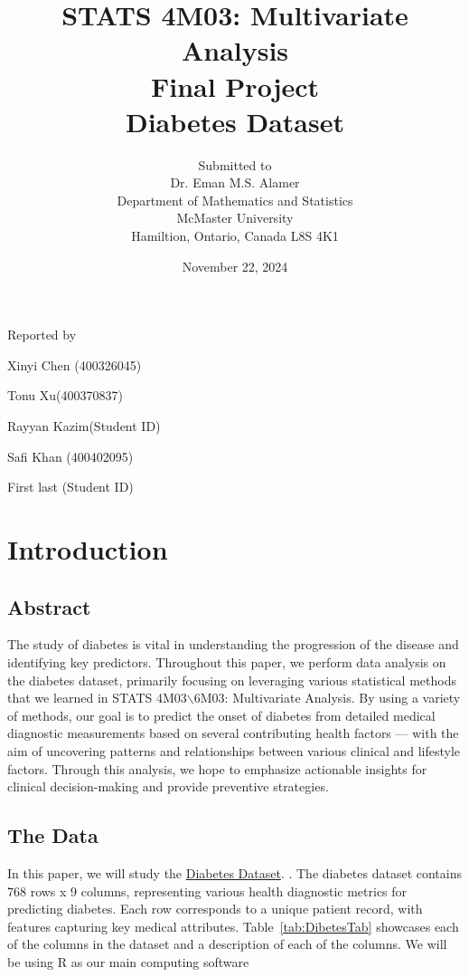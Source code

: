 \documentclass[12pt]{article}
\begin{document}
\title{STATS 4M03: Multivariate Analysis\\ Final Project \\ Diabetes Dataset }

\author{Submitted to\\ Dr. Eman M.S. Alamer 
\\Department of Mathematics and Statistics
\\McMaster University\\Hamiltion, Ontario, Canada L8S 4K1}
\date {November 22, 2024}


\maketitle

 \centerline{Reported by}
 \centerline{Xinyi Chen (400326045)}
  \centerline{Tonu Xu(400370837)}
   \centerline{Rayyan Kazim(Student ID)}
    \centerline{Safi Khan (400402095)}
     \centerline{First last (Student ID)}


\newpage
\section{Introduction}
\subsection{Abstract}

The study of diabetes is vital in understanding the progression of the disease and identifying key predictors. Throughout this paper, we perform data analysis on the diabetes dataset, primarily focusing on leveraging various statistical methods that we learned in STATS 4M03$\backslash$6M03: Multivariate Analysis. By using a variety of methods, our goal is to predict the onset of diabetes from detailed medical diagnostic measurements based on several contributing health factors --- with the aim of uncovering patterns and relationships between various clinical and lifestyle factors. Through this analysis, we hope to emphasize actionable insights for clinical decision-making and provide preventive strategies. 

\subsection{The Data}

In this paper, we will study the \href{https://www.kaggle.com/datasets/hasibur013/diabetes-dataset}{Diabetes Dataset}. \cite{Kaggles}. The diabetes dataset contains 768 rows x 9 columns, representing various health diagnostic metrics for predicting diabetes. Each row corresponds to a unique patient record, with features capturing key medical attributes. Table~\ref{tab:DibetesTab} showcases each of the columns in the dataset and a description of each of the columns. We will be using R \cite{Rlang} as our main computing software
\end{document}
